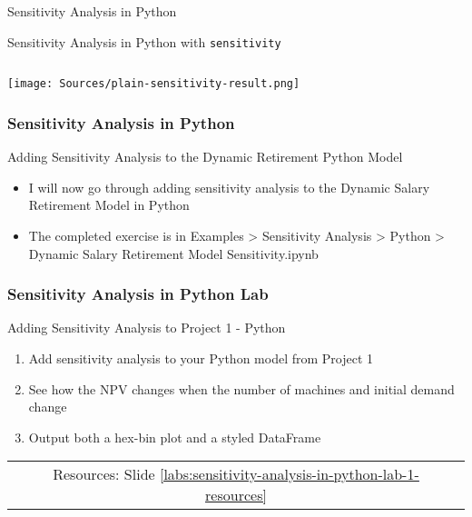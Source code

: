 \documentclass[handout, 11pt]{beamer}
\begin{document}
\begin{section}[SA Python]{Sensitivity Analysis in Python}
\begin{frame}[fragile]
\begin{block}{Sensitivity Analysis in Python with \texttt{sensitivity}}
\begin{verbatim}
\end{verbatim}
\texttt{[image: Sources/plain-sensitivity-result.png]}
\end{block}
\end{frame}
\begin{frame}
\frametitle{Sensitivity Analysis in Python}
{
\begin{block}{Adding Sensitivity Analysis to the Dynamic Retirement Python Model}
\begin{itemize}
\item I will now go through adding sensitivity analysis to the Dynamic Salary Retirement Model in Python
\item The completed exercise is in Examples > Sensitivity Analysis > Python > Dynamic Salary Retirement Model Sensitivity.ipynb
\end{itemize}
\end{block}
}
\end{frame}
\begin{frame}
\frametitle{Sensitivity Analysis in Python Lab}
{
\begin{block}{Adding Sensitivity Analysis to Project 1 - Python}
\begin{enumerate}
\item Add sensitivity analysis to your Python model from Project 1
\item See how the NPV changes when the number of machines and initial demand change
\item Output both a hex-bin plot and a styled DataFrame
\end{enumerate}
\vfill
\begin{tabular*}{\textwidth}{@{\extracolsep{\fill}}ccc}
\toprule
\hfill & Resources: Slide \textcolor{blue}{\underline{\ref{labs:sensitivity-analysis-in-python-lab-1-resources}}} & \hfill\\

\end{tabular*}
\end{block}
}
\label{labs:sensitivity-analysis-in-python-lab-1}
\end{frame}
\end{section}
\appendix
{}
\setcounter{finalframe}{\value{framenumber}}
\end{document}
